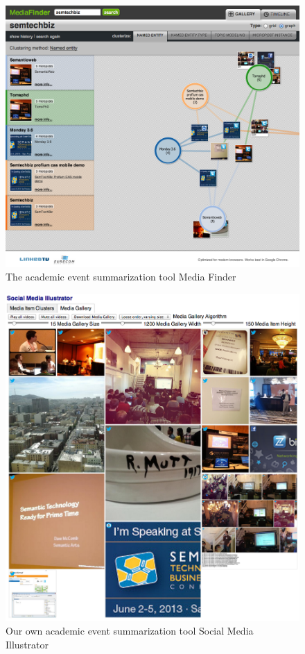 \begin{figure}
  \centering
  \includegraphics[width=\linewidth]{mediafinder.png}
  \caption{The academic event summarization tool Media Finder}
  \label{fig:mediafinder}
\end{figure}

\begin{figure}
  \centering
  \includegraphics[width=\linewidth]{socialmediaillustrator.png}
  \caption{Our own academic event summarization tool Social Media Illustrator}
  \label{fig:socialmediaillustrator}
\end{figure}

